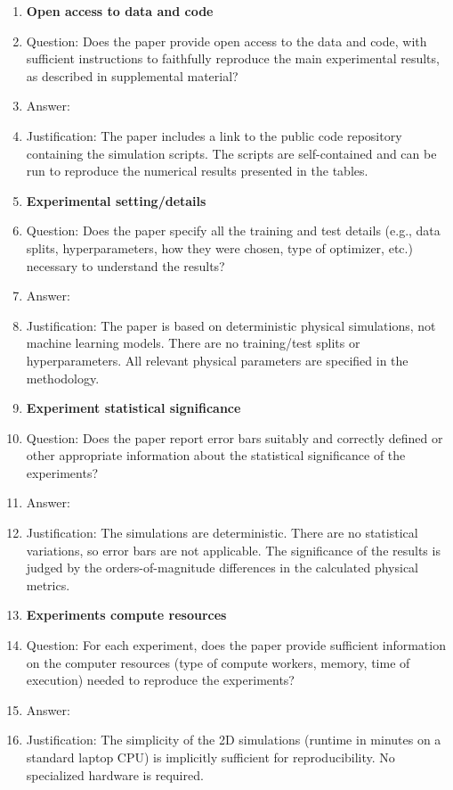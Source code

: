 \documentclass{article}
\begin{document}
\begin{enumerate}
\item {\bf Open access to data and code}
    \item[] Question: Does the paper provide open access to the data and code, with sufficient instructions to faithfully reproduce the main experimental results, as described in supplemental material?
    \item[] Answer: \answerYes{}
    \item[] Justification: The paper includes a link to the public code repository containing the simulation scripts. The scripts are self-contained and can be run to reproduce the numerical results presented in the tables.

\item {\bf Experimental setting/details}
    \item[] Question: Does the paper specify all the training and test details (e.g., data splits, hyperparameters, how they were chosen, type of optimizer, etc.) necessary to understand the results?
    \item[] Answer: \answerNA{}
    \item[] Justification: The paper is based on deterministic physical simulations, not machine learning models. There are no training/test splits or hyperparameters. All relevant physical parameters are specified in the methodology.

\item {\bf Experiment statistical significance}
    \item[] Question: Does the paper report error bars suitably and correctly defined or other appropriate information about the statistical significance of the experiments?
    \item[] Answer: \answerNA{}
    \item[] Justification: The simulations are deterministic. There are no statistical variations, so error bars are not applicable. The significance of the results is judged by the orders-of-magnitude differences in the calculated physical metrics.

\item {\bf Experiments compute resources}
    \item[] Question: For each experiment, does the paper provide sufficient information on the computer resources (type of compute workers, memory, time of execution) needed to reproduce the experiments?
    \item[] Answer: \answerYes{}
    \item[] Justification: The simplicity of the 2D simulations (runtime in minutes on a standard laptop CPU) is implicitly sufficient for reproducibility. No specialized hardware is required.


\end{enumerate}
\end{document}
